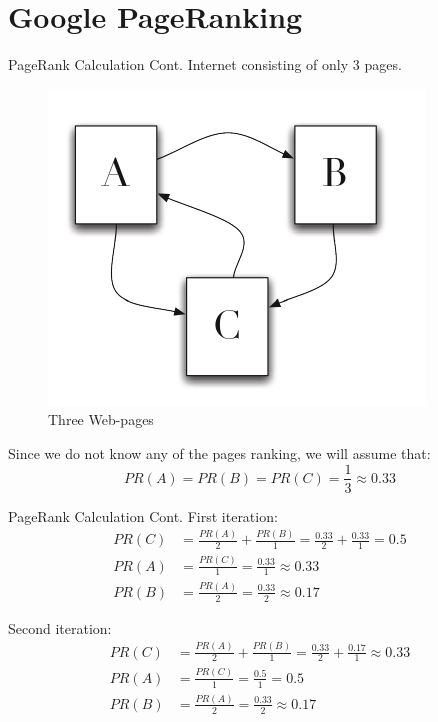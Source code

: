 \documentclass[10pt]{beamer}
\begin{document}
\section{Google PageRanking}
{
\begin{frame}{PageRank Calculation Cont.}
    Internet consisting of only 3 pages. 
  \begin{figure}
		\includegraphics[scale=0.5]{images/Figure1.pdf}
        \caption{Three Web-pages}\label{fig:three-pages}
   \end{figure}
  Since we do not know any of the pages ranking, we will assume that:  
	\begin{equation*}
    	PR(A) = PR(B) = PR(C) = \frac{1}{3} \approx 0.33
	\end{equation*}
\end{frame}

\begin{frame}{PageRank Calculation Cont.}
First iteration:
 	\begin{align*}
    		PR(C) &=\frac{PR(A)}{2}  + \frac{PR(B)}{1}  = \frac{0.33}{2} + \frac{0.33}{1} = 0.5\\
            PR(A) &=\frac{PR(C)}{1}  = \frac{0.33}{1} \approx 0.33\\
            PR(B) &=\frac{PR(A)}{2}  = \frac{0.33}{2} \approx 0.17
	\end{align*}
    
Second iteration:
 	\begin{align*}
    		PR(C) &=\frac{PR(A)}{2}  + \frac{PR(B)}{1}  = \frac{0.33}{2} + \frac{0.17}{1} \approx 0.33\\
            PR(A) &=\frac{PR(C)}{1}  = \frac{0.5}{1} = 0.5\\
            PR(B) &=\frac{PR(A)}{2}  = \frac{0.33}{2} \approx 0.17
	\end{align*}
\end{frame}
}  
\end{document}
